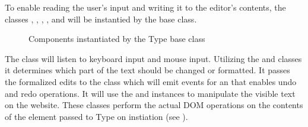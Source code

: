 To enable reading the user's input and writing it to the editor's contents, the classes , , , ,  and  will be instantied by the  base class.


\begin{figure}[!htb]
\centering
{}
\caption{Components instantiated by the Type base class}
\label{fig:type_base_components}
\end{figure}


\noindent The  class will listen to keyboard input and mouse input. Utilizing the  and  classes it determines which part of the text should be changed or formatted. It passes the formalized edits to the  class which will emit events for an  that enables undo and redo operations. It will use the  and  instances to manipulate the visible text on the website. These classes perform the actual DOM operations on the contents of the element passed to Type on instiation (see ).

